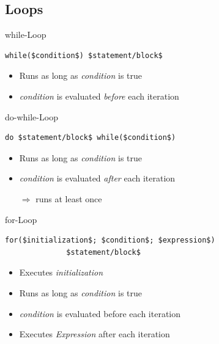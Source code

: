 \documentclass[english,compress]{beamer}
\begin{document}
\subsection{Loops}
\begin{frame}[fragile]
	\begin{block}{while-Loop}
		\begin{lstlisting}[numbers=none]
			while($condition$) $statement/block$
		\end{lstlisting}
		\begin{itemize}
			\item Runs as long as \textit{condition} is true
			\item \textit{condition} is evaluated \emph{before} each iteration
		\end{itemize}
	\end{block}
	\begin{block}{do-while-Loop}
		\begin{lstlisting}[numbers=none]
			do $statement/block$ while($condition$)
		\end{lstlisting}
		\begin{itemize}
			\item Runs as long as \textit{condition} is true
			\item \textit{condition} is evaluated \emph{after} each iteration
			\item[$\Rightarrow$] runs at least once
		\end{itemize}
	\end{block}
\end{frame}

\begin{frame}[fragile]
	\begin{block}{for-Loop}
		\begin{lstlisting}[numbers=none]
			for($initialization$; $condition$; $expression$)
			  $statement/block$
		\end{lstlisting}
		\begin{itemize}
			\item Executes \textit{initialization}
			\item Runs as long as \textit{condition} is true
			\item \textit{condition} is evaluated before each iteration
			\item Executes \textit{Expression} after each iteration
		\end{itemize}
	\end{block}
\end{frame}
\end{document}
